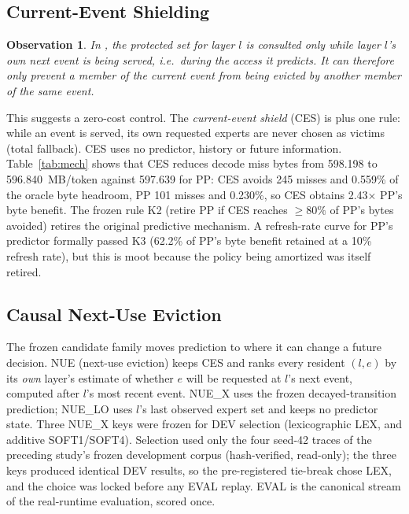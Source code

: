 \documentclass[11pt]{article}
\theoremstyle{plain}
\newtheorem{observation}{Observation}
\theoremstyle{definition}
\newcommand{\code}[1]{\texttt{\seqsplit{#1}}}
\begin{document}
\subsection{Current-Event Shielding}
\begin{observation}
In \code{predicted\_protect}, the protected set for layer $l$ is consulted only while layer $l$'s own next event is being served, i.e.\ during the access it predicts. It can therefore only prevent a member of the current event from being evicted by another member of the same event.
\end{observation}

This suggests a zero-cost control. The \emph{current-event shield} (CES) is \code{b\_selected} plus one rule: while an event is served, its own requested experts are never chosen as victims (total fallback). CES uses no predictor, history or future information. Table~\ref{tab:mech} shows that CES reduces decode miss bytes from 598.198 to 596.840~MB/token against 597.639 for PP: CES avoids 245 misses and 0.559\% of the oracle byte headroom, PP 101 misses and 0.230\%, so CES obtains 2.43$\times$ PP's byte benefit. The frozen rule K2 (retire PP if CES reaches $\ge 80\%$ of PP's bytes avoided) retires the original predictive mechanism. A refresh-rate curve for PP's predictor formally passed K3 (62.2\% of PP's byte benefit retained at a 10\% refresh rate), but this is moot because the policy being amortized was itself retired.



\subsection{Causal Next-Use Eviction}
The frozen candidate family moves prediction to where it can change a future decision. NUE (next-use eviction) keeps CES and ranks every resident $(l, e)$ by its \emph{own} layer's estimate of whether $e$ will be requested at $l$'s next event, computed after $l$'s most recent event. NUE\_X uses the frozen decayed-transition prediction; NUE\_LO uses $l$'s last observed expert set and keeps no predictor state. Three NUE\_X keys were frozen for DEV selection (lexicographic LEX, and additive SOFT1/SOFT4). Selection used only the four seed-42 traces of the preceding study's frozen development corpus (hash-verified, read-only); the three keys produced identical DEV results, so the pre-registered tie-break chose LEX, and the choice was locked before any EVAL replay. EVAL is the canonical stream of the real-runtime evaluation, scored once.
\end{document}
